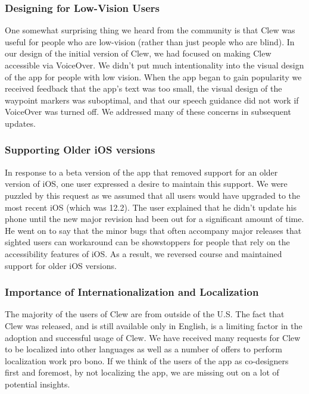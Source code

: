 \documentclass[chi]{sigchi}
\begin{document}
\subsubsection{Designing for Low-Vision Users}
One somewhat surprising thing we heard from the community is that Clew was useful for people who are low-vision (rather than just people who are blind).  In our design of the initial version of Clew, we had focused on making Clew  accessible via VoiceOver.  We didn't put much intentionality into the visual design of the app for people with low vision.  When the app began to gain popularity we received feedback that the app's text was too small, the visual design of the waypoint markers was suboptimal, and that our speech guidance did not work if VoiceOver was turned off.  We addressed many of these concerns in subsequent updates.

\subsubsection{Supporting Older iOS versions}

In response to a beta version of the app that removed support for an older version of iOS, one user expressed a desire to maintain this support.  We were puzzled by this request as we assumed that all users would have upgraded to the most recent iOS (which was 12.2).  The user explained that he didn't update his phone until the new major revision had been out for a significant amount of time.  He went on to say that the minor bugs that often accompany major releases that sighted users can workaround can be showstoppers for people that rely on the accessibility features of iOS.  As a result, we reversed course and maintained support for older iOS versions.

\subsubsection{Importance of Internationalization and Localization}

The majority of the users of Clew are from outside of the U.S.  The fact that Clew was released, and is still available only in English, is a limiting factor in the adoption and successful usage of Clew.  We have received many requests for Clew to be localized into other languages as well as a number of offers to perform localization work pro bono.  If we think of the users of the app as co-designers first and foremost, by not localizing the app, we are missing out on a lot of potential insights. %
\end{document}
